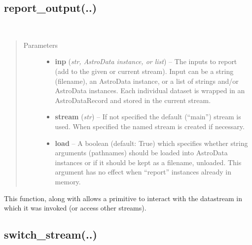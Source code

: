 \documentclass[letterpaper,10pt,english]{sphinxmanual}
\begin{document}
\subsection{report\_output(..)}
\label{chapter_ReductionContextClass:report-output}

\begin{fulllineitems}
\label{chapter_ReductionContextClass:astrodata.RecipeManager.ReductionContext.report_output}~\begin{quote}\begin{description}
\item[{Parameters}] \leavevmode\begin{itemize}
\item {} 
\textbf{inp} (\emph{str, AstroData instance, or list}) -- The inputs to report (add to the given or current stream).
Input can be a string (filename), an AstroData instance, or a list of
strings and/or AstroData instances.  Each individual dataset is
wrapped in an AstroDataRecord and stored in the current stream.

\item {} 
\textbf{stream} (\emph{str}) -- If not specified the default (``main'') stream is used.
When specified the named stream is created if necessary.

\item {} 
\textbf{load} -- A boolean (default: True) which specifies whether string
arguments (pathnames) should be loaded into AstroData instances
or if it should be kept as a filename, unloaded.  This argument
has no effect when ``report''
 instances already in memory.

\end{itemize}

\end{description}\end{quote}

This function, along with  allows a primitive to
interact with the datastream in which it was invoked (or access
other streams).

\end{fulllineitems}



\subsection{switch\_stream(..)}
\label{chapter_ReductionContextClass:switch-stream}
\end{document}

